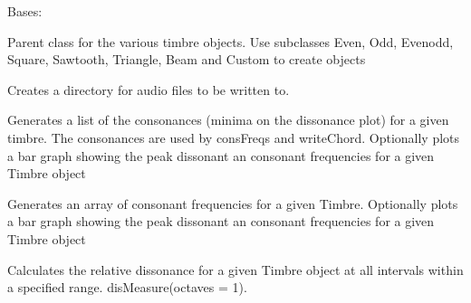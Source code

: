 \documentclass[letterpaper,10pt,english]{sphinxmanual}
\begin{document}
\begin{fulllineitems}
\label{index:Timbre.timbre.Timbre}
Bases: 

Parent class for the various timbre objects. Use subclasses Even, Odd, Evenodd, Square, Sawtooth, Triangle, Beam and Custom to create objects

\begin{fulllineitems}
\label{index:Timbre.timbre.Timbre.audioGenPath}
Creates a directory for audio files to be written to.

\end{fulllineitems}


\begin{fulllineitems}
\label{index:Timbre.timbre.Timbre.consDisFreqs}
Generates a list of the consonances (minima on the dissonance plot) for a given timbre. The consonances are used by consFreqs and writeChord. Optionally plots a bar graph                  showing the peak dissonant an consonant frequencies for a given Timbre object

\end{fulllineitems}


\begin{fulllineitems}
\label{index:Timbre.timbre.Timbre.consFreqs}
Generates an array of consonant frequencies for a given Timbre. Optionally plots a bar graph showing the peak dissonant an consonant frequencies for a given Timbre object

\end{fulllineitems}


\begin{fulllineitems}
\label{index:Timbre.timbre.Timbre.disMeasure}
Calculates the relative dissonance for a given Timbre object at all intervals within a specified range. disMeasure(octaves = 1).


\end{fulllineitems}
\end{fulllineitems}
\end{document}
